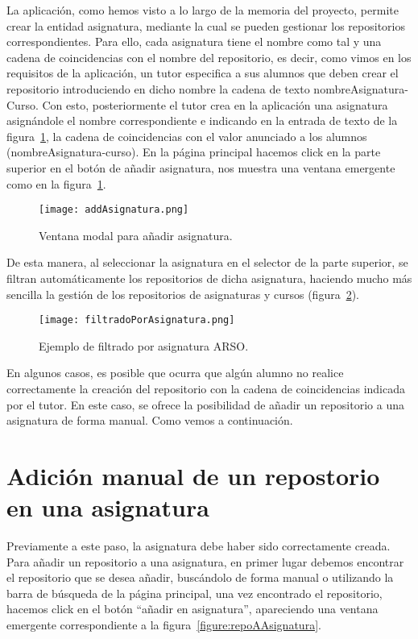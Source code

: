 La aplicación, como hemos visto a lo largo de la memoria del proyecto,
permite crear la entidad asignatura, mediante la cual se pueden gestionar
los repositorios correspondientes. Para ello, cada asignatura tiene el
nombre como tal y una cadena de coincidencias con el nombre del
repositorio, es decir, como vimos en los requisitos de la aplicación, un
tutor especifica a sus alumnos que deben crear el repositorio introduciendo
en dicho nombre la cadena de texto nombreAsignatura-Curso. Con esto,
posteriormente el tutor crea en la aplicación una asignatura asignándole el
nombre correspondiente e indicando en la entrada de texto de la
figura~\ref{figure:addAsignatura}, la cadena de coincidencias con el valor
anunciado a los alumnos (nombreAsignatura-curso). En la página principal
hacemos click en la parte superior en el botón de añadir asignatura, nos
muestra una ventana emergente como en la figura~\ref{figure:addAsignatura}.

\begin{figure}[h!]
  \texttt{[image: addAsignatura.png]}
  \caption{Ventana modal para añadir asignatura.}
  \label{figure:addAsignatura}
\end{figure}

De esta manera, al seleccionar la asignatura en el selector de la parte
superior, se filtran automáticamente los repositorios de dicha asignatura,
haciendo mucho más sencilla la gestión de los repositorios de asignaturas y
cursos (figura~\ref{figure:filtradoAsignatura}).

\begin{figure}[h!]
  \texttt{[image: filtradoPorAsignatura.png]}
  \caption{Ejemplo de filtrado por asignatura ARSO.}
  \label{figure:filtradoAsignatura}
\end{figure}

En algunos casos, es posible que ocurra que algún alumno no realice
correctamente la creación del repositorio con la cadena de coincidencias
indicada por el tutor. En este caso, se ofrece la posibilidad de añadir un
repositorio a una asignatura de forma manual. Como vemos a continuación.



\section{Adición manual de un repostorio en una asignatura}

Previamente a este paso, la asignatura debe haber sido correctamente
creada. Para añadir un repositorio a una asignatura, en primer lugar
debemos encontrar el repositorio que se desea añadir, buscándolo de forma
manual o utilizando la barra de búsqueda de la página principal, una vez
encontrado el repositorio, hacemos click en el botón ``añadir en
asignatura'', apareciendo una ventana emergente correspondiente a la
figura~\ref{figure:repoAAsignatura}.

